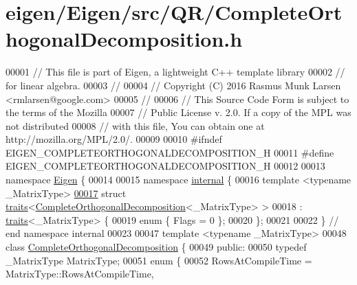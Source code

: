 \hypertarget{eigen_2_eigen_2src_2_q_r_2_complete_orthogonal_decomposition_8h_source}{}\section{eigen/\+Eigen/src/\+Q\+R/\+Complete\+Orthogonal\+Decomposition.h}
\label{eigen_2_eigen_2src_2_q_r_2_complete_orthogonal_decomposition_8h_source}

\begin{DoxyCode}
00001 \textcolor{comment}{// This file is part of Eigen, a lightweight C++ template library}
00002 \textcolor{comment}{// for linear algebra.}
00003 \textcolor{comment}{//}
00004 \textcolor{comment}{// Copyright (C) 2016 Rasmus Munk Larsen <rmlarsen@google.com>}
00005 \textcolor{comment}{//}
00006 \textcolor{comment}{// This Source Code Form is subject to the terms of the Mozilla}
00007 \textcolor{comment}{// Public License v. 2.0. If a copy of the MPL was not distributed}
00008 \textcolor{comment}{// with this file, You can obtain one at http://mozilla.org/MPL/2.0/.}
00009 
00010 \textcolor{preprocessor}{#ifndef EIGEN\_COMPLETEORTHOGONALDECOMPOSITION\_H}
00011 \textcolor{preprocessor}{#define EIGEN\_COMPLETEORTHOGONALDECOMPOSITION\_H}
00012 
00013 \textcolor{keyword}{namespace }\hyperlink{namespace_eigen}{Eigen} \{
00014 
00015 \textcolor{keyword}{namespace }\hyperlink{namespaceinternal}{internal} \{
00016 \textcolor{keyword}{template} <\textcolor{keyword}{typename} \_MatrixType>
\hyperlink{struct_eigen_1_1internal_1_1traits_3_01_complete_orthogonal_decomposition_3_01___matrix_type_01_4_01_4}{00017} \textcolor{keyword}{struct }\hyperlink{struct_eigen_1_1internal_1_1traits}{traits}<\hyperlink{group___q_r___module_class_eigen_1_1_complete_orthogonal_decomposition}{CompleteOrthogonalDecomposition}<\_MatrixType> >
00018     : \hyperlink{struct_eigen_1_1internal_1_1traits}{traits}<\_MatrixType> \{
00019   \textcolor{keyword}{enum} \{ Flags = 0 \};
00020 \};
00021 
00022 \}  \textcolor{comment}{// end namespace internal}
00023 
00047 \textcolor{keyword}{template} <\textcolor{keyword}{typename} \_MatrixType>
00048 \textcolor{keyword}{class }\hyperlink{group___q_r___module_class_eigen_1_1_complete_orthogonal_decomposition}{CompleteOrthogonalDecomposition} \{
00049  \textcolor{keyword}{public}:
00050   \textcolor{keyword}{typedef} \_MatrixType MatrixType;
00051   \textcolor{keyword}{enum} \{
00052     RowsAtCompileTime = MatrixType::RowsAtCompileTime,

\end{DoxyCode}

